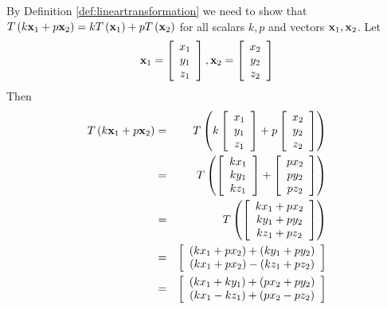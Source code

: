 \begin{solution}
By Definition \ref{def:lineartransformation} we need to show that $T\left( k {\bf x}_1 + p {\bf x}_2 \right) = kT\left({\bf x}_1\right)+ pT\left({\bf x}_{2} \right)$ for all scalars $k,p$ and vectors ${\bf x}_1, {\bf x}_2$.
Let
\[
{\bf x}_1 = \left[\begin{array}{c} x_1 \\ y_1 \\ z_1 \end{array}\right], 
{\bf x}_2 = \left[\begin{array}{c} x_2 \\ y_2 \\ z_2 \end{array}\right]
\]
Then
\begin{eqnarray*}
T\left( k \vect{x}_1 + p \vect{x}_2 \right) &=& T \left( k \leftB\begin{array}{c} x_1 \\ y_1 \\ z_1 \end{array}\rightB + p \leftB\begin{array}{c} x_2 \\ y_2 \\ z_2 \end{array}\rightB \right) \\
&=& T \left(  \leftB\begin{array}{c} kx_1 \\ ky_1 \\ kz_1 \end{array}\rightB +  \leftB\begin{array}{c} px_2 \\ py_2 \\ pz_2 \end{array}\rightB \right) \\
&=& T \left(  \leftB\begin{array}{c} kx_1 + px_2 \\ ky_1 + py_2 \\ kz_1 + pz_2 \end{array}\rightB  \right) \\
&=& \leftB\begin{array}{c} (kx_1 + px_2) + (ky_1 + py_2) \\ (kx_1 + px_2)- (kz_1 + pz_2) \end{array}\rightB \\
&=& \leftB\begin{array}{c} (kx_1 + ky_1) + (px_2 + py_2) \\ (kx_1 - kz_1) + (px_2 - pz_2) \end{array}\rightB \\

\end{eqnarray*}
\end{solution}
